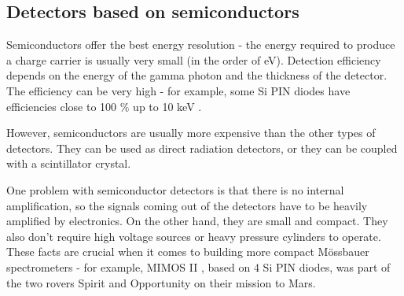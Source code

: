 \subsection{Detectors based on semiconductors}
Semiconductors offer the best energy resolution - the energy required to produce a charge carrier is usually very small (in the order of eV). Detection efficiency depends on the energy of the gamma photon and the thickness of the detector. The efficiency can be very high - for example, some Si PIN diodes have efficiencies close to 100 $\%$ up to 10 keV \cite{SiCdTe}.
\par
However, semiconductors are usually more expensive than the other types of detectors. They can be used as direct radiation detectors, or they can be coupled with a scintillator crystal.
\par
One problem with semiconductor detectors is that there is no internal amplification, so the signals coming out of the detectors have to be heavily amplified by electronics.
On the other hand, they are small and compact. They also don't require high voltage sources or heavy pressure cylinders to operate. These facts are crucial when it comes to building more compact Mössbauer spectrometers - for example, MIMOS II \cite{https://doi.org/10.1029/2003JE002138}, based on 4 Si PIN diodes, was part of the two rovers Spirit and Opportunity on their mission to Mars.




